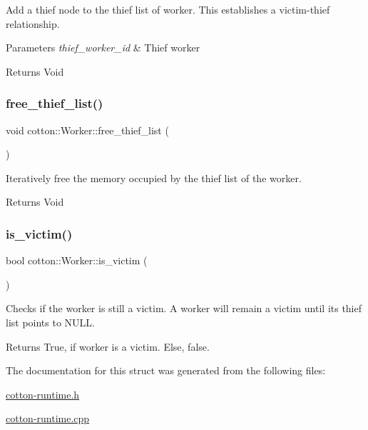 Add a thief node to the thief list of worker. This establishes a victim-\/thief relationship.


\begin{DoxyParams}{Parameters}
{\em thief\+\_\+worker\+\_\+id} & Thief worker \\
\hline
\end{DoxyParams}
\begin{DoxyReturn}{Returns}
Void 
\end{DoxyReturn}
\mbox{\label{structcotton_1_1Worker_a2c5e25bbc0b0e2417281ed2832b728a5}} 
\subsubsection{\texorpdfstring{free\+\_\+thief\+\_\+list()}{free\_thief\_list()}}
{\footnotesize\ttfamily void cotton\+::\+Worker\+::free\+\_\+thief\+\_\+list (\begin{DoxyParamCaption}{ }\end{DoxyParamCaption})}

Iteratively free the memory occupied by the thief list of the worker.

\begin{DoxyReturn}{Returns}
Void 
\end{DoxyReturn}
\mbox{\label{structcotton_1_1Worker_a1c6114b25a55f514124704d2073a9a9a}} 
\subsubsection{\texorpdfstring{is\+\_\+victim()}{is\_victim()}}
{\footnotesize\ttfamily bool cotton\+::\+Worker\+::is\+\_\+victim (\begin{DoxyParamCaption}{ }\end{DoxyParamCaption})}

Checks if the worker is still a victim. A worker will remain a victim until its thief list points to N\+U\+LL.

\begin{DoxyReturn}{Returns}
True, if worker is a victim. Else, false. 
\end{DoxyReturn}


The documentation for this struct was generated from the following files\+:\begin{DoxyCompactItemize}
\item 
\mbox{\hyperlink{cotton-runtime_8h}{cotton-\/runtime.\+h}}\item 
\mbox{\hyperlink{cotton-runtime_8cpp}{cotton-\/runtime.\+cpp}}\end{DoxyCompactItemize}
